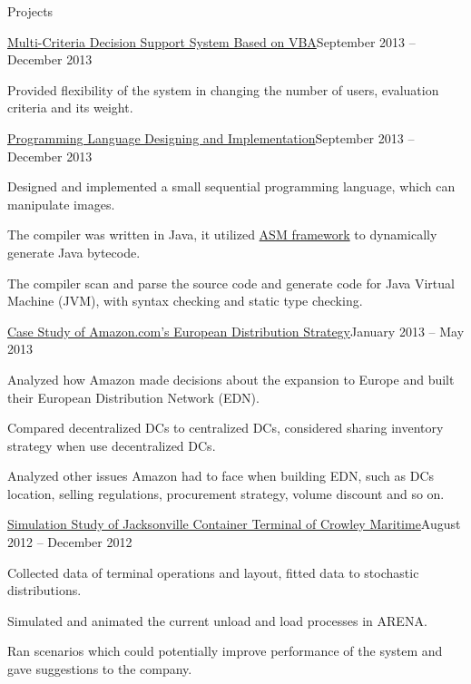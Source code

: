 \documentclass{resume} %
\begin{document}
\begin{rSection}{Projects}
\begin{rSubsection}{\href{https://drive.google.com/folderview?id=0B72jE2yMNz2wdU9VanNpZUFXS3M&usp=sharing}{Multi-Criteria Decision Support System Based on VBA}}{September 2013 -- December 2013}{}{}
\item Provided flexibility of the system in changing the number of users, evaluation criteria and its weight.
\end{rSubsection}
\begin{rSubsection}{\href{https://code.google.com/p/plp-project-zhujiaqi/}{Programming Language Designing and Implementation}}{September 2013 -- December 2013}{}{}
\item Designed and implemented a small sequential programming language, which can manipulate images.
\item The compiler was written in Java, it utilized \href{http://asm.ow2.org/}{ASM framework} to dynamically generate Java bytecode.
\item The compiler scan and parse the source code and generate code for Java Virtual Machine (JVM), with syntax checking and static type checking.
\end{rSubsection}
\begin{rSubsection}{\href{https://drive.google.com/folderview?id=0B72jE2yMNz2wQXUzZXlWamJjd0E&usp=sharing}{Case Study of Amazon.com's European Distribution Strategy}}{January 2013 -- May 2013}{}{}
\item Analyzed how Amazon made decisions about the expansion to Europe and built their European Distribution Network (EDN).
\item Compared decentralized DCs to centralized DCs, considered sharing inventory strategy when use decentralized DCs.
\item Analyzed other issues Amazon had to face when building EDN, such as DCs location, selling regulations, procurement strategy, volume discount and so on.
\end{rSubsection}
\begin{rSubsection}{\href{https://drive.google.com/folderview?id=0B72jE2yMNz2wb0xNZl9WeUN1OWs&usp=sharing}{Simulation Study of Jacksonville Container Terminal of Crowley Maritime}}{August 2012 -- December 2012}{}{}
\item Collected data of terminal operations and layout, fitted data to stochastic distributions.
\item Simulated and animated the current unload and load processes in ARENA.
\item Ran scenarios which could potentially improve performance of the system and gave suggestions to the company.

\end{rSubsection}
\end{rSection}
\end{document}
